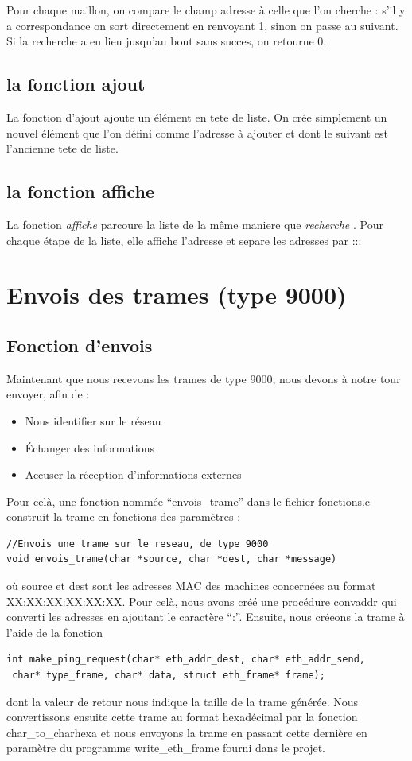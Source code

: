 \documentclass[a4paper,11pt]{article}
\begin{document}
	Pour chaque maillon, on compare le champ adresse à celle que l'on cherche : s'il y a correspondance on sort directement en renvoyant 1, sinon on passe au suivant. Si la recherche a eu lieu jusqu'au bout sans succes, on retourne 0.
	\subsection{la fonction ajout}
	La fonction d'ajout ajoute un élément en tete de liste. On crée simplement un nouvel élément que l'on défini comme l'adresse à ajouter et dont le suivant est l'ancienne tete de liste.
	\subsection{la fonction affiche}
	La fonction  \textit{affiche} parcoure la liste de la même maniere que  \textit{recherche} . Pour chaque étape de la liste, elle affiche l'adresse et separe les adresses par :::
	\section{Envois des trames (type 9000)}
	\subsection{Fonction d'envois}
	Maintenant que nous recevons les trames de type 9000, nous devons à notre tour envoyer, afin de :
	\begin{itemize}
	\item Nous identifier sur le réseau
	\item Échanger des informations
	\item Accuser la réception d'informations externes
	\end{itemize}
	Pour celà, une fonction nommée ``envois\_trame'' dans le fichier fonctions.c construit la trame en fonctions des paramètres :
	\lstset{language=C}
\begin{lstlisting}
//Envois une trame sur le reseau, de type 9000
void envois_trame(char *source, char *dest, char *message)
\end{lstlisting}
	où source et dest sont les adresses MAC des machines concernées au format XX:XX:XX:XX:XX:XX. Pour celà, nous avons créé une procédure convaddr qui converti les adresses en ajoutant le caractère \enquote{:}. Ensuite, nous créeons la trame à l'aide de la fonction
	\lstset{language=C}
\begin{lstlisting}
int make_ping_request(char* eth_addr_dest, char* eth_addr_send,
 char* type_frame, char* data, struct eth_frame* frame);
\end{lstlisting}
	dont la valeur de retour nous indique la taille de la trame générée. Nous convertissons ensuite cette trame au format hexadécimal par la fonction char\_to\_charhexa et nous envoyons la trame en passant cette dernière en paramètre du programme write\_eth\_frame fourni dans le projet.
\end{document}
